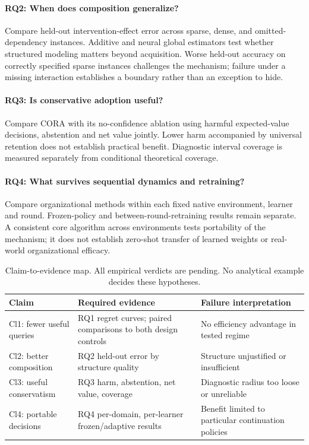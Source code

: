 \documentclass[runningheads]{llncs}
\begin{document}
\paragraph{RQ2: When does composition generalize?}
Compare held-out intervention-effect error across sparse, dense, and omitted-dependency instances. Additive and neural global estimators test whether structured modeling matters beyond acquisition. Worse held-out accuracy on correctly specified sparse instances challenges the mechanism; failure under a missing interaction establishes a boundary rather than an exception to hide.
\paragraph{RQ3: Is conservative adoption useful?}
Compare CORA with its no-confidence ablation using harmful expected-value decisions, abstention and net value jointly. Lower harm accompanied by universal retention does not establish practical benefit. Diagnostic interval coverage is measured separately from conditional theoretical coverage.
\paragraph{RQ4: What survives sequential dynamics and retraining?}
Compare organizational methods within each fixed native environment, learner and round. Frozen-policy and between-round-retraining results remain separate. A consistent core algorithm across environments tests portability of the mechanism; it does not establish zero-shot transfer of learned weights or real-world organizational efficacy.

\begin{table}[t]
    \caption{Claim-to-evidence map. All empirical verdicts are pending. No analytical example decides these hypotheses.}\label{tab:claims}
    \small\begin{tabularx}{\textwidth}{@{}lXX@{}}\toprule
        Claim                     & Required evidence                                             & Failure interpretation                              \\\midrule
        Cl1: fewer useful queries & RQ1 regret curves; paired comparisons to both design controls & No efficiency advantage in tested regime            \\
        Cl2: better composition   & RQ2 held-out error by structure quality                       & Structure unjustified or insufficient               \\
        Cl3: useful conservatism  & RQ3 harm, abstention, net value, coverage                     & Diagnostic radius too loose or unreliable           \\
        Cl4: portable decisions   & RQ4 per-domain, per-learner frozen/adaptive results           & Benefit limited to particular continuation policies \\\bottomrule
    \end{tabularx}\end{table}
\end{document}
